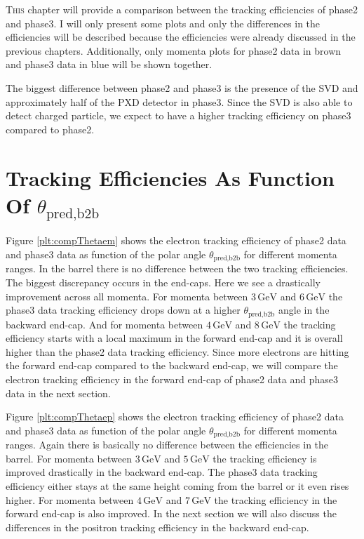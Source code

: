 \documentclass[a4paper,11pt,twosided,final,german,openbib,pdftex,listof=totoc,bibliography=totoc]{scrbook}
\begin{document}
\lettrine{T}{his} chapter will provide a comparison between the tracking efficiencies of phase2 and phase3. I will only present some plots and only the differences in the efficiencies will be described because the efficiencies were already discussed in the previous chapters. Additionally, only momenta plots for phase2 data in brown and phase3 data in blue will be shown together.
\newline

The biggest difference between phase2 and phase3 is the presence of the SVD and approximately half of the PXD detector in phase3.
Since the SVD is also able to detect charged particle, we expect to have a higher tracking efficiency on phase3 compared to phase2.

\section{Tracking Efficiencies As Function Of $\theta_{\textrm{pred,b2b}}$}


Figure \ref{plt:compThetaem} shows the electron tracking efficiency of phase2 data and phase3 data as function of the polar angle $\theta_{\textrm{pred,b2b}}$ for different momenta ranges. In the barrel there is no difference between the two tracking efficiencies. The biggest discrepancy occurs in the end-caps. Here we see a drastically improvement across all momenta. 
For momenta between $3\,\textrm{GeV}$ and $6\,\textrm{GeV}$ the phase3 data tracking efficiency drops down at a higher $\theta_{\textrm{pred,b2b}}$ angle in the backward end-cap. 
And for momenta between $4\,\textrm{GeV}$ and $8\,\textrm{GeV}$ the tracking efficiency starts with a local maximum in the forward end-cap and it is overall higher than the phase2 data tracking efficiency. Since more electrons are hitting the forward end-cap compared to the backward end-cap, we will compare the electron tracking efficiency in the forward end-cap of phase2 data and phase3 data in the next section. 


Figure \ref{plt:compThetaep} shows the electron tracking efficiency of phase2 data and phase3 data as function of the polar angle $\theta_{\textrm{pred,b2b}}$ for different momenta ranges. Again there is basically no difference between the efficiencies in the barrel. 
For momenta between $3\,\textrm{GeV}$ and $5\,\textrm{GeV}$ the tracking efficiency is improved drastically in the backward end-cap. The phase3 data tracking efficiency either stays at the same height coming from the barrel or it even rises higher. 
For momenta between $4\,\textrm{GeV}$ and $7\,\textrm{GeV}$ the tracking efficiency in the forward end-cap is also improved. In the next section we will also discuss the differences in the positron tracking efficiency in the backward end-cap.
\end{document}

